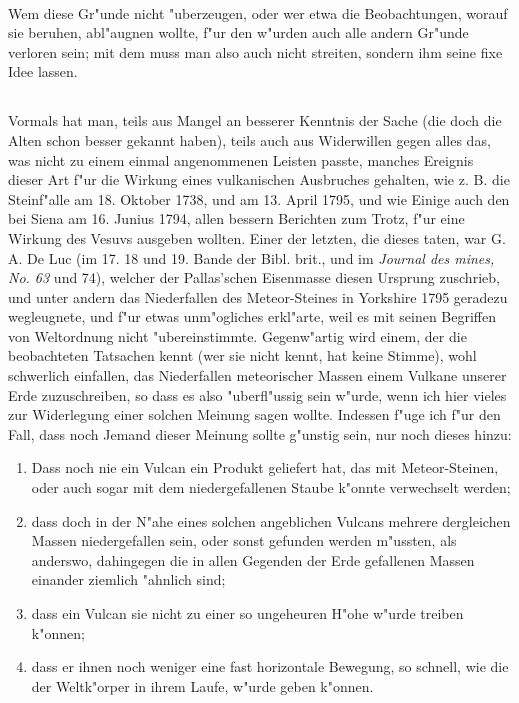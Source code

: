 \documentclass[a4paper, 11pt, oneside, polutonikogreek, german]{article}
\begin{document}
\paragraph{}
Wem diese Gr"unde nicht "uberzeugen, oder wer etwa die Beobachtungen, worauf sie beruhen, abl"augnen wollte, f"ur den w"urden auch alle andern Gr"unde verloren sein; mit dem muss man also auch nicht streiten, sondern ihm seine fixe Idee lassen.
\subsection{}
\paragraph{}
Vormals hat man, teils aus Mangel an besserer Kenntnis der Sache (die doch die Alten schon besser gekannt haben), teils auch aus Widerwillen gegen alles das, was nicht zu einem einmal angenommenen Leisten passte, manches Ereignis dieser Art f"ur die Wirkung eines vulkanischen Ausbruches gehalten, wie z. B. die Steinf"alle am 18. Oktober 1738, und am 13. April 1795, und wie Einige auch den bei Siena am 16. Junius 1794, allen bessern Berichten zum Trotz, f"ur eine Wirkung des Vesuvs ausgeben wollten. Einer der letzten, die dieses taten, war G. A. De Luc (im 17. 18 und 19. Bande der Bibl. brit., und im \emph{Journal des mines, No. 63} und 74), welcher der Pallas'schen Eisenmasse diesen Ursprung zuschrieb, und unter andern das Niederfallen des Meteor-Steines in Yorkshire 1795 geradezu wegleugnete, und f"ur etwas unm"ogliches erkl"arte, weil es mit seinen Begriffen von Weltordnung nicht "ubereinstimmte. Gegenw"artig wird einem, der die beobachteten Tatsachen kennt (wer sie nicht kennt, hat keine Stimme), wohl schwerlich einfallen, das Niederfallen meteorischer Massen einem Vulkane unserer Erde zuzuschreiben, so dass es also "uberfl"ussig sein w"urde, wenn ich hier vieles zur Widerlegung einer solchen Meinung sagen wollte. Indessen f"uge ich f"ur den Fall, dass noch Jemand dieser Meinung sollte g"unstig sein, nur noch dieses hinzu:
\begin{enumerate}
    \item Dass noch nie ein Vulcan ein Produkt geliefert hat, das mit Meteor-Steinen, oder auch sogar mit dem niedergefallenen Staube k"onnte verwechselt werden;
    \item dass doch in der N"ahe eines solchen angeblichen Vulcans mehrere dergleichen Massen niedergefallen sein, oder sonst gefunden werden m"ussten, als anderswo, dahingegen die in allen Gegenden der Erde gefallenen Massen einander ziemlich "ahnlich sind;
    \item dass ein Vulcan sie nicht zu einer so ungeheuren H"ohe w"urde treiben k"onnen;
    \item dass er ihnen noch weniger eine fast horizontale Bewegung, so schnell, wie die der Weltk"orper in ihrem Laufe, w"urde geben k"onnen.
\end{enumerate}
\end{document}
